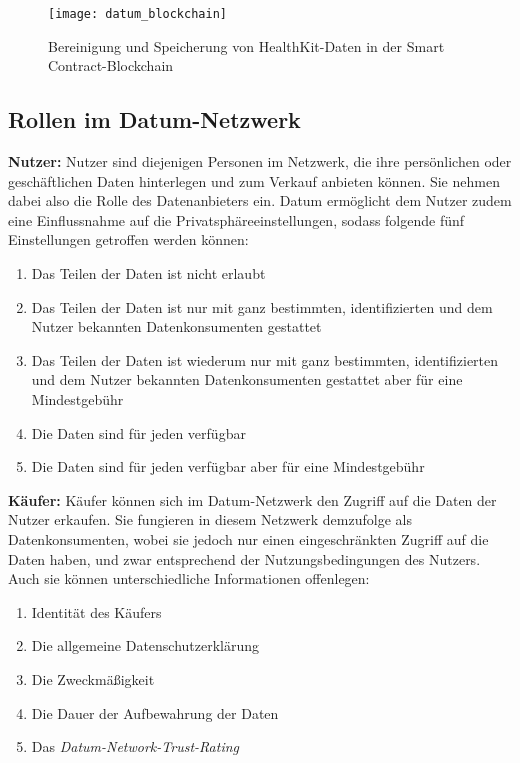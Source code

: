 \begin{figure}[!ht]
	\centering
	\texttt{[image: datum\_blockchain]}
	\caption{Bereinigung und Speicherung von HealthKit-Daten in der Smart Contract-Blockchain \cite{datum_2017}}
	\label{fig:datumBlockchain}
\end{figure}

\subsection{Rollen im Datum-Netzwerk}
\textbf{Nutzer:} Nutzer sind diejenigen Personen im Netzwerk, die ihre persönlichen oder geschäftlichen Daten hinterlegen und zum Verkauf anbieten können. Sie nehmen dabei also die Rolle des Datenanbieters ein. Datum ermöglicht dem Nutzer zudem eine Einflussnahme auf die Privatsphäreeinstellungen, sodass folgende fünf Einstellungen getroffen werden können: 
\begin{enumerate}
	\item Das Teilen der Daten ist nicht erlaubt
	\item Das Teilen der Daten ist nur mit ganz bestimmten, identifizierten und dem Nutzer bekannten Datenkonsumenten gestattet
	\item Das Teilen der Daten ist wiederum nur mit ganz bestimmten, identifizierten und dem Nutzer bekannten Datenkonsumenten gestattet aber für eine Mindestgebühr
	\item Die Daten sind für jeden verfügbar
	\item Die Daten sind für jeden verfügbar aber für eine Mindestgebühr
\end{enumerate}

\noindent \textbf{Käufer:} Käufer können sich im Datum-Netzwerk den Zugriff auf die Daten der Nutzer erkaufen. Sie fungieren in diesem Netzwerk demzufolge als Datenkonsumenten, wobei sie jedoch nur einen eingeschränkten Zugriff auf die Daten haben, und zwar entsprechend der Nutzungsbedingungen des Nutzers. Auch sie können unterschiedliche Informationen offenlegen:
\begin{enumerate}
	\item Identität des Käufers
	\item Die allgemeine Datenschutzerklärung
	\item Die Zweckmäßigkeit
	\item Die Dauer der Aufbewahrung der Daten
	\item Das \textit{Datum-Network-Trust-Rating}
\end{enumerate}

